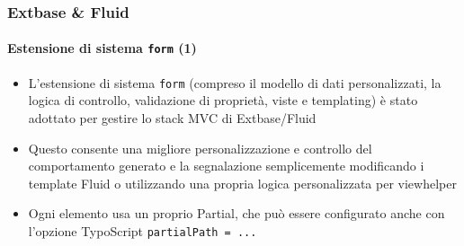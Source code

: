 \begin{frame}[fragile]
	\frametitle{Extbase \& Fluid}
	\framesubtitle{Estensione di sistema \texttt{form} (1)}

	\begin{itemize}

		\item L'estensione di sistema \texttt{form} (compreso il modello di dati personalizzati,
			la logica di controllo, validazione di proprietà, viste e templating) è stato adottato per gestire
			lo stack MVC di Extbase/Fluid

		\item Questo consente una migliore personalizzazione e controllo del comportamento generato 
			e la segnalazione semplicemente modificando i template Fluid o utilizzando una propria
			logica personalizzata per viewhelper

		\item Ogni elemento usa un proprio Partial, che può essere configurato anche 
			con l'opzione TypoScript \texttt{partialPath = ...}

	\end{itemize}

\end{frame}


